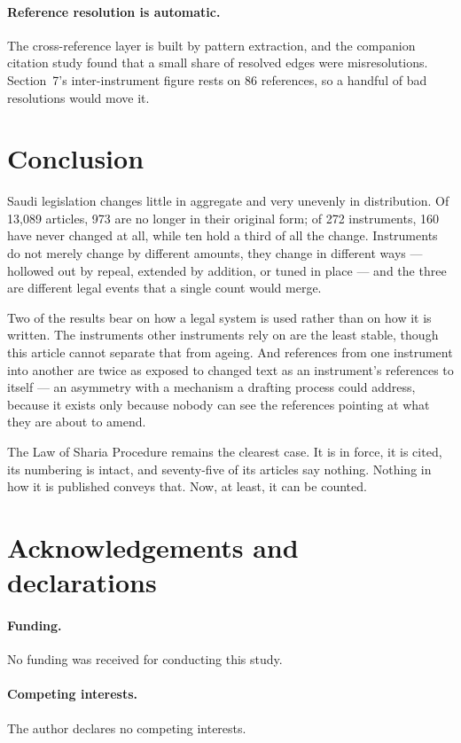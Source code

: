\documentclass[11pt]{article}
\begin{document}
\paragraph{Reference resolution is automatic.} The cross-reference layer is
built by pattern extraction, and the companion citation study found that a
small share of resolved edges were misresolutions. Section~7's
inter-instrument figure rests on 86 references, so a handful of bad
resolutions would move it.

\section{Conclusion}

Saudi legislation changes little in aggregate and very unevenly in
distribution. Of 13,089 articles, 973 are no longer in their original form; of
272 instruments, 160 have never changed at all, while ten hold a third of all
the change. Instruments do not merely change by different amounts, they change
in different ways --- hollowed out by repeal, extended by addition, or tuned in
place --- and the three are different legal events that a single count would
merge.

Two of the results bear on how a legal system is used rather than on how it is
written. The instruments other instruments rely on are the least stable, though
this article cannot separate that from ageing. And references from one
instrument into another are twice as exposed to changed text as an
instrument's references to itself --- an asymmetry with a mechanism a drafting
process could address, because it exists only because nobody can see the
references pointing at what they are about to amend.

The Law of Sharia Procedure remains the clearest case. It is in force, it is
cited, its numbering is intact, and seventy-five of its articles say nothing.
Nothing in how it is published conveys that. Now, at least, it can be counted.


\section*{Acknowledgements and declarations}

\paragraph{Funding.} No funding was received for conducting this study.

\paragraph{Competing interests.} The author declares no competing interests.
\end{document}
